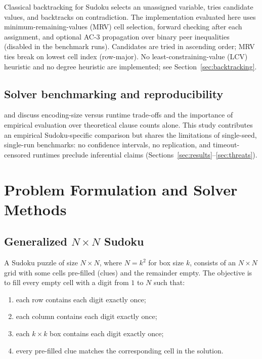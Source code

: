 \documentclass[a4paper,fleqn]{cas-sc}
\begin{document}
Classical backtracking for Sudoku selects an unassigned variable, tries candidate values, and backtracks on contradiction. The implementation evaluated here uses minimum-remaining-values (MRV) cell selection, forward checking after each assignment, and optional AC-3 propagation over binary peer inequalities (disabled in the benchmark runs). Candidates are tried in ascending order; MRV ties break on lowest cell index (row-major). No least-constraining-value (LCV) heuristic and no degree heuristic are implemented; see Section~\ref{sec:backtracking}.

\subsection{Solver benchmarking and reproducibility}

\citet{nguyen2020empirical} and \citet{sheng2025reencoding} discuss encoding-size versus runtime trade-offs and the importance of empirical evaluation over theoretical clause counts alone. This study contributes an empirical Sudoku-specific comparison but shares the limitations of single-seed, single-run benchmarks: no confidence intervals, no replication, and timeout-censored runtimes preclude inferential claims (Sections~\ref{sec:results}--\ref{sec:threats}).


\section{Problem Formulation and Solver Methods}\label{sec:formulation}

\subsection{Generalized \(N\times N\) Sudoku}

A Sudoku puzzle of size \(N\times N\), where \(N=k^2\) for box size \(k\), consists of an \(N\times N\) grid with some cells pre-filled (clues) and the remainder empty. The objective is to fill every empty cell with a digit from \(1\) to \(N\) such that:
\begin{enumerate}
    \item each row contains each digit exactly once;
    \item each column contains each digit exactly once;
    \item each \(k\times k\) box contains each digit exactly once;
    \item every pre-filled clue matches the corresponding cell in the solution.
\end{enumerate}
\end{document}
